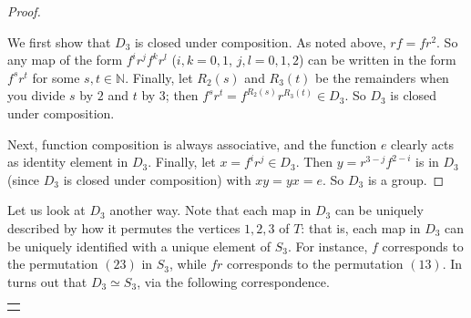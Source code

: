 \documentclass[10pt,openany,oneside]{book}
\theoremstyle{plain}
\theoremstyle{definition}
\theoremstyle{definition}
\theoremstyle{definition}
\theoremstyle{definition}
\numberwithin{equation}{section}
\newlength{\panelmax}
\def\N{\mathbb{N}}
\begin{document}
\begin{proof}\hypertarget{proof-29}{}
We first show that \(D_3\) is closed under composition. As noted above, \(rf=fr^2\). So any map of the form \(f^ir^jf^kr^l\) (\(i,k=0,1\), \(j,l=0,1,2\)) can be written in the form \(f^sr^t\) for some \(s,t \in \N\). Finally, let \(R_2(s)\) and \(R_3(t)\) be the remainders when you divide \(s\) by \(2\) and \(t\) by \(3\); then \(f^sr^t=f^{R_2(s)}r^{R_3(t)} \in D_3\). So \(D_3\) is closed under composition.%
\par
Next, function composition is always associative, and the function \(e\) clearly acts as identity element in \(D_3\). Finally, let \(x=f^ir^j\in D_3\). Then \(y=r^{3-j}f^{2-i}\) is in \(D_3\) (since \(D_3\) is closed under composition) with \(xy=yx=e\). So \(D_3\) is a group.%
\end{proof}
\label{notation-61}
 Let us look at \(D_3\) another way. Note that each map in \(D_3\) can be uniquely described by how it permutes the vertices \(1,2,3\) of \(T\): that is, each map in \(D_3\) can be uniquely identified with a unique element of \(S_3\). For instance, \(f\) corresponds to the permutation \((23)\) in \(S_3\), while \(fr\) corresponds to the permutation \((13)\). In turns out that \(D_3 \simeq S_3\), via the following correspondence.%
{%
\setlength{\panelmax}{0pt}
\newsavebox{\panelboxMtabular}
\newlength{\phMtabular}\setlength{\phMtabular}{\ht\panelboxMtabular+\dp\panelboxMtabular}
\settototalheight{\phMtabular}{\usebox{\panelboxMtabular}}
\setlength{\panelmax}{\maxof{\panelmax}{\phMtabular}}
\leavevmode%
\setlength{\tabcolsep}{0\linewidth}
\par\medskip\noindent
\begin{tabular}{@{}*{1}{c}@{}}
\begin{minipage}[c][\panelmax][t]{1\linewidth}\usebox{\panelboxMtabular}\end{minipage}\end{tabular}\\
}%
\end{document}
